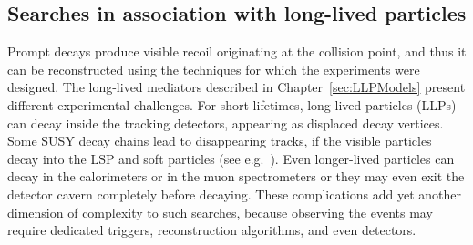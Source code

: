 \subsection{Searches in association with long-lived particles}
\label{sec:results_LLPSearches}


Prompt decays produce visible recoil originating at the collision point, and thus it can be reconstructed using the techniques for which the experiments were designed.
The long-lived mediators described in Chapter~\ref{sec:LLPModels} present different experimental challenges. 
For short lifetimes, long-lived particles (LLPs) can decay inside the tracking detectors, appearing as displaced decay vertices. 
Some SUSY decay chains lead to disappearing tracks, if the visible particles decay into the LSP and soft particles (see e.g.~\cite{Aaboud:2017mpt, CMS:2014gxa}). %
Even longer-lived particles can decay in the calorimeters or in the muon spectrometers
or they may even exit the detector cavern completely before decaying. 
These complications add yet another dimension of complexity to such searches, because observing the events may require dedicated triggers, reconstruction algorithms, and even detectors\cite{Ball:2016zrp,Chou:2016lxi}. 


